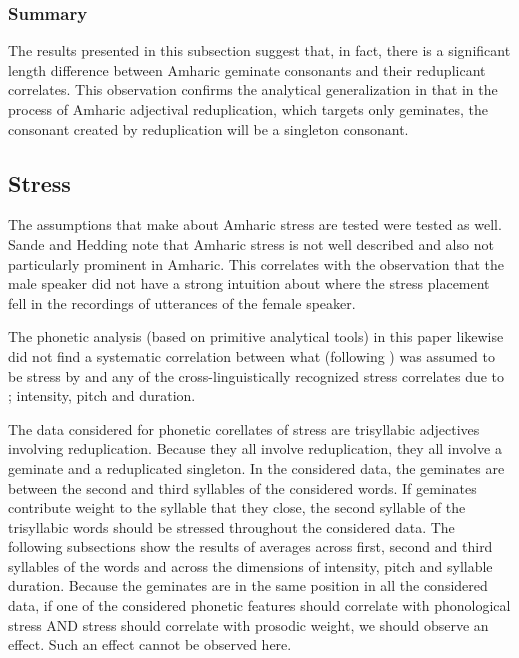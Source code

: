 \documentclass[12pt]{scrartcl}
\begin{document}
\subsubsection{Summary}

The results presented in this subsection suggest that, in fact, there is a significant length difference between Amharic geminate consonants and their reduplicant correlates. This observation confirms the analytical generalization in \cite{sande2017} that in the process of Amharic adjectival reduplication, which targets only geminates, the consonant created by reduplication will be a singleton consonant.



\subsection{Stress}

The assumptions that \cite{sande2017} make about Amharic stress are tested were tested as well. Sande and Hedding note that Amharic stress is not well described and also not particularly prominent in Amharic. This correlates with the observation that the male speaker did not have a strong intuition about where the stress placement fell in the recordings of utterances of the female speaker.


The phonetic analysis (based on primitive analytical tools) in this paper likewise did not find a systematic correlation between what (following \cite{leslau-amharic-grammar}) was assumed to be stress by \cite{sande2017} and any of the cross-linguistically recognized stress correlates due to \cite{hayes1995}; intensity, pitch and duration.

The data considered for phonetic corellates of stress are trisyllabic adjectives involving reduplication. Because they all involve reduplication, they all involve a geminate and a reduplicated singleton. In the considered data, the geminates are between the second and third syllables of the considered words. If geminates contribute weight to the syllable that they close, the second syllable of the trisyllabic words should be stressed throughout the considered data. The following subsections show the results of averages across first, second and third syllables of the words and across the dimensions of intensity, pitch and syllable duration.%
Because the geminates are in the same position in all the considered data, if one of the considered phonetic features should correlate with phonological stress AND stress should correlate with prosodic weight, we should observe an effect. Such an effect cannot be observed here.
\end{document}
